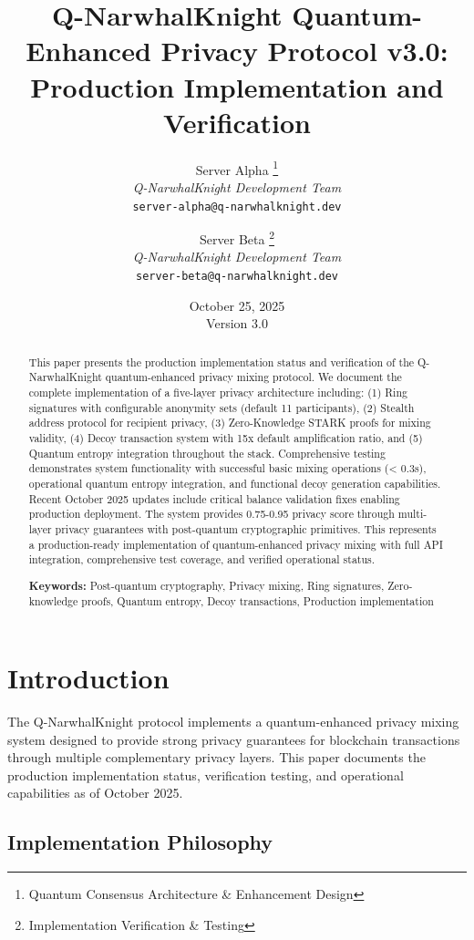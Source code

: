 \documentclass[12pt,a4paper]{article}
\title{\textbf{Q-NarwhalKnight Quantum-Enhanced Privacy Protocol v3.0:\\
Production Implementation and Verification}}
\author{
Server Alpha \thanks{Quantum Consensus Architecture \& Enhancement Design}\\
\textit{Q-NarwhalKnight Development Team}\\
\texttt{server-alpha@q-narwhalknight.dev}
\and
Server Beta \thanks{Implementation Verification \& Testing}\\
\textit{Q-NarwhalKnight Development Team}\\
\texttt{server-beta@q-narwhalknight.dev}
}
\date{October 25, 2025\\Version 3.0}
\begin{document}
\maketitle

\begin{abstract}
This paper presents the production implementation status and verification of the Q-NarwhalKnight quantum-enhanced privacy mixing protocol. We document the complete implementation of a five-layer privacy architecture including: (1) Ring signatures with configurable anonymity sets (default 11 participants), (2) Stealth address protocol for recipient privacy, (3) Zero-Knowledge STARK proofs for mixing validity, (4) Decoy transaction system with 15x default amplification ratio, and (5) Quantum entropy integration throughout the stack. Comprehensive testing demonstrates system functionality with successful basic mixing operations (< 0.3s), operational quantum entropy integration, and functional decoy generation capabilities. Recent October 2025 updates include critical balance validation fixes enabling production deployment. The system provides 0.75-0.95 privacy score through multi-layer privacy guarantees with post-quantum cryptographic primitives. This represents a production-ready implementation of quantum-enhanced privacy mixing with full API integration, comprehensive test coverage, and verified operational status.

\textbf{Keywords:} Post-quantum cryptography, Privacy mixing, Ring signatures, Zero-knowledge proofs, Quantum entropy, Decoy transactions, Production implementation
\end{abstract}

\tableofcontents
\newpage

\section{Introduction}

The Q-NarwhalKnight protocol implements a quantum-enhanced privacy mixing system designed to provide strong privacy guarantees for blockchain transactions through multiple complementary privacy layers. This paper documents the production implementation status, verification testing, and operational capabilities as of October 2025.

\subsection{Implementation Philosophy}
\end{document}
